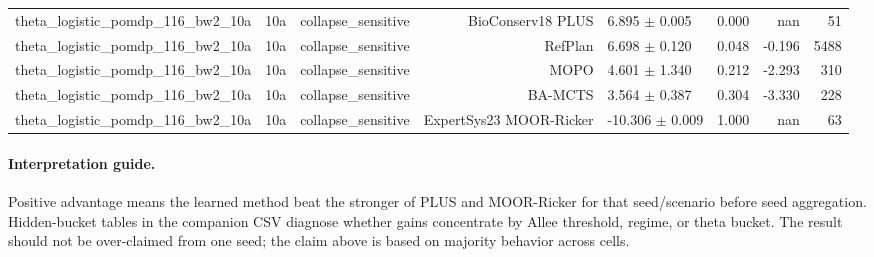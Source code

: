 \documentclass{article}
\begin{document}
\begin{longtable}{lllrlrrr}
theta\_logistic\_pomdp\_116\_bw2\_10a & 10a & collapse\_sensitive & BioConserv18 PLUS & 6.895 $\pm$ 0.005 & 0.000 & nan & 51 \\
theta\_logistic\_pomdp\_116\_bw2\_10a & 10a & collapse\_sensitive & RefPlan & 6.698 $\pm$ 0.120 & 0.048 & -0.196 & 5488 \\
theta\_logistic\_pomdp\_116\_bw2\_10a & 10a & collapse\_sensitive & MOPO & 4.601 $\pm$ 1.340 & 0.212 & -2.293 & 310 \\
theta\_logistic\_pomdp\_116\_bw2\_10a & 10a & collapse\_sensitive & BA-MCTS & 3.564 $\pm$ 0.387 & 0.304 & -3.330 & 228 \\
theta\_logistic\_pomdp\_116\_bw2\_10a & 10a & collapse\_sensitive & ExpertSys23 MOOR-Ricker & -10.306 $\pm$ 0.009 & 1.000 & nan & 63 \\
\bottomrule
\end{longtable}

\paragraph{Interpretation guide.}
Positive advantage means the learned method beat the stronger of PLUS and
MOOR-Ricker for that seed/scenario before seed aggregation. Hidden-bucket
tables in the companion CSV diagnose whether gains concentrate by Allee
threshold, regime, or theta bucket. The result should not be over-claimed from
one seed; the claim above is based on majority behavior across cells.
\end{document}
